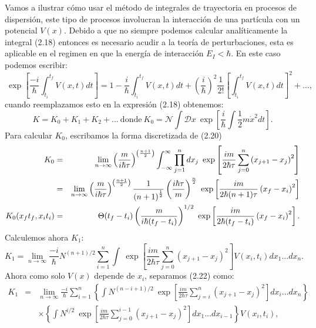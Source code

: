 Vamos a ilustrar cómo usar el método de integrales de trayectoria en procesos de dispersión, este tipo de procesos involucran la interacción de una partícula con un potencial $V(x)$. Debido a que no siempre podemos calcular analíticamente la integral (2.18) entonces es necesario acudir a la teoría de perturbaciones, esta es aplicable en el regimen en que la energía de interacción $E_I<\hbar$. En este caso podemos escribir:
\begin{equation}
\ \exp\left[\frac{-i}{\hbar}\int_{t_{i}}^{t_{f}}V(x,t)dt\right]=1-\frac{i}{\hbar}\int_{t_{i}}^{t_{f}}V(x,t)dt+\left(\frac{i}{\hbar}\right)^{2}\frac{1}{2!}\left[\int_{t_{i}}^{t_{f}}V(x,t)dt\right]^{2}+... ,
\end{equation}
cuando reemplazamos esto en la expresión (2.18) obtenemos:
\begin{equation}
K=K_0+K_1+K_2+...\ \text{donde}\ K_0=\mathcal{N}\int \mathcal{D}x \ \exp\left[ \frac{i}{\hbar}\int \frac{1}{2}m\dot{x}^2dt\right] .
\end{equation}
Para calcular $K_0$, escribamos la forma discretizada de (2.20)
\begin{eqnarray}
\nonumber K_0&=&\lim_{n\to\infty}\left(\frac{m}{i\hbar\tau}\right)^{\left(\frac{n+1}{2}\right)}\int_{-\infty}^{\text{\ensuremath{\infty}}}\prod_{j=1}^{n}dx_{j}\ \exp\left[\frac{im}{2\hbar\tau}\sum_{j=0}^{n}\left(x_{j+1}-x_{j}\right)^{2}\right]\\
\nonumber &=& \lim_{n\to\infty}\left(\frac{m}{i\hbar\tau}\right)^{\left(\frac{n+1}{2}\right)}\frac{1}{\left(n+1\right)^{\frac{1}{2}}}\left(\frac{i\hbar\tau}{m}\right)^{\frac{n}{2}}\ \exp\left[\frac{im}{2\hbar(n+1)\tau}\left(x_{f}-x_{i}\right)^{2}\right]\\
K_0(x_ft_f,x_it_i)&=& \Theta(t_{f}-t_{i})\left(\frac{m}{i\hbar(t_{f}-t_{i})}\right)^{1/2}\ \exp\left[\frac{im}{2\hbar(t_{f}-t_{i})}\left(x_{f}-x_{i}\right)^{2}\right] .
\end{eqnarray}
Calculemos ahora $K_1$:
\begin{equation}
K_1=\lim_{n\to\infty}\frac{-i}{\hbar}N^{(n+1)/2}\sum_{i=1}^{n}\int\ \exp\left[\frac{im}{2\hbar\tau}\sum_{j=0}^{n}(x_{j+1}-x_{j})^{2}\right]V(x_{i},t_{i})dx_{1}...dx_{n}.
\end{equation}
Ahora como solo $V(x)$ depende de $x_i$, separamos (2.22) como:
\begin{eqnarray}
\nonumber K_1&=&\lim_{n\to\infty}\frac{-i}{\hbar}\sum_{i=1}^{n}\left\{ \int N^{(n-i+1)/2}\ \exp\left[\frac{im}{2\hbar\tau}\sum_{j=i}^{n}(x_{j+1}-x_{j})^{2}\right]dx_{i}...dx_{n}\right\}\\
& &\times  \left\{ \int N^{i/2}\ \exp\left[\frac{im}{2\hbar\tau}\sum_{j=0}^{i-1}(x_{j+1}-x_{j})^{2}\right]dx_{1}...dx_{i-1}\right\} V(x_{i},t_{i}),
\end{eqnarray}
